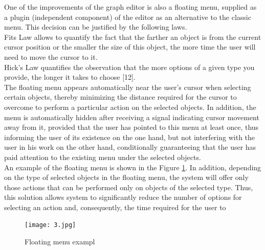 \documentclass[a4paper]{article}
\begin{document}
\begin{multicols}{2}
\begin{justify}
One of the improvements of the graph editor is also a
floating menu, supplied as a plugin (independent component) of the editor as an alternative to the classic menu.
This decision can be justified by the following laws.\\
Fits Law allows to quantify the fact that the farther an
object is from the current cursor position or the smaller
the size of this object, the more time the user will need
to move the cursor to it.\\
Hick’s Law quantifies the observation that the more
options of a given type you provide, the longer it takes
to choose [12].\\
The floating menu appears automatically near the
user’s cursor when selecting certain objects, thereby
minimizing the distance required for the cursor to overcome to perform a particular action on the selected
objects. In addition, the menu is automatically hidden
after receiving a signal indicating cursor movement away
from it, provided that the user has pointed to this menu
at least once, thus informing the user of its existence on
the one hand, but not interfering with the user in his
work on the other hand, conditionally guaranteeing that
the user has paid attention to the existing menu under
the selected objects.\\
An example of the floating menu is shown in the Figure
\ref{7}.
In addition, depending on the type of selected objects
in the floating menu, the system will offer only those
actions that can be performed only on objects of the
selected type. Thus, this solution allows system to significantly reduce the number of options for selecting an
action and, consequently, the time required for the user to
\begin{figure}[H]
    \centering
    \texttt{[image: 3.jpg]} 
    \caption{ Floating menu exampl\label{7}}
    

\end{figure}
\end{justify}
\end{multicols}
\end{document}
